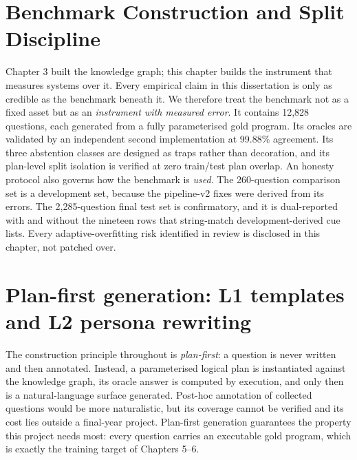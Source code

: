 \documentclass[10pt]{article} %
\begin{document}
\section{Benchmark Construction and Split Discipline}\label{sec:chapter-4-benchmark-construction-and-spl}

Chapter 3 built the knowledge graph; this chapter builds the instrument that measures systems over it. Every empirical claim in this dissertation is only as credible as the benchmark beneath it. We therefore treat the benchmark not as a fixed asset but as an \emph{instrument with measured error}. It contains 12,828 questions, each generated from a fully parameterised gold program. Its oracles are validated by an independent second implementation at 99.88\% agreement. Its three abstention classes are designed as traps rather than decoration, and its plan-level split isolation is verified at zero train/test plan overlap. An honesty protocol also governs how the benchmark is \emph{used}. The 260-question comparison set is a development set, because the pipeline-v2 fixes were derived from its errors. The 2,285-question final test set is confirmatory, and it is dual-reported with and without the nineteen rows that string-match development-derived cue lists. Every adaptive-overfitting risk identified in review is disclosed in this chapter, not patched over.

\section{Plan-first generation: L1 templates and L2 persona rewriting}\label{sec:plan-first-generation-l1-templates-and-l}

The construction principle throughout is \emph{plan-first}: a question is never written and then annotated. Instead, a parameterised logical plan is instantiated against the knowledge graph, its oracle answer is computed by execution, and only then is a natural-language surface generated. Post-hoc annotation of collected questions would be more naturalistic, but its coverage cannot be verified and its cost lies outside a final-year project. Plan-first generation guarantees the property this project needs most: every question carries an executable gold program, which is exactly the training target of Chapters 5--6.
\end{document}
